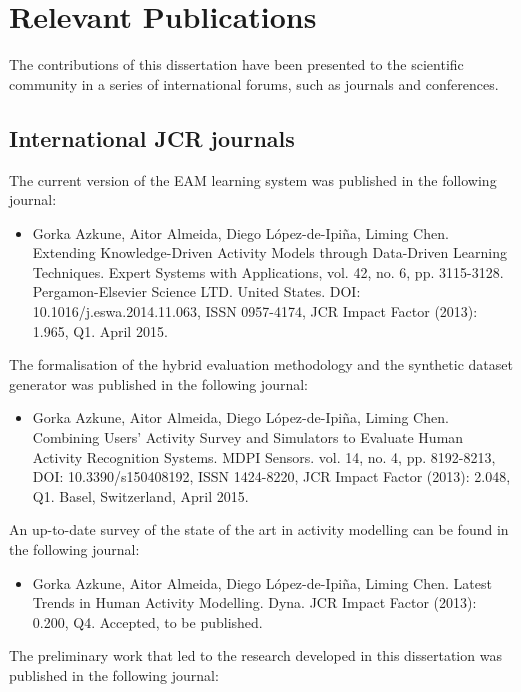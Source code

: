 \section{Relevant Publications}
\label{sec:conclusions:pub}

The contributions of this dissertation have been presented to the scientific community in a series of international forums, such as journals and conferences.

\subsection{International JCR journals}

The current version of the EAM learning system was published in the following journal:

\begin{itemize}
 \item Gorka Azkune, Aitor Almeida, Diego López-de-Ipiña, Liming Chen. Extending Knowledge-Driven Activity Models through Data-Driven Learning Techniques. Expert Systems with Applications, vol. 42, no. 6, pp. 3115-3128. Pergamon-Elsevier Science LTD. United States. DOI: 10.1016/j.eswa.2014.11.063, ISSN 0957-4174, JCR Impact Factor (2013): 1.965, Q1. April 2015. 
\end{itemize}

The formalisation of the hybrid evaluation methodology and the synthetic dataset generator was published in the following journal:

\begin{itemize}
 \item Gorka Azkune, Aitor Almeida, Diego López-de-Ipiña, Liming Chen. Combining Users' Activity Survey and Simulators to Evaluate Human Activity Recognition Systems. MDPI Sensors. vol. 14, no. 4, pp. 8192-8213, DOI: 10.3390/s150408192, ISSN 1424-8220, JCR Impact Factor (2013): 2.048, Q1. Basel, Switzerland, April 2015.
\end{itemize}

An up-to-date survey of the state of the art in activity modelling can be found in the following journal:

\begin{itemize}
 \item Gorka Azkune, Aitor Almeida, Diego López-de-Ipiña, Liming Chen. Latest Trends in Human Activity Modelling. Dyna. JCR Impact Factor (2013): 0.200, Q4. Accepted, to be published. 
\end{itemize}

The preliminary work that led to the research developed in this dissertation was published in the following journal:

